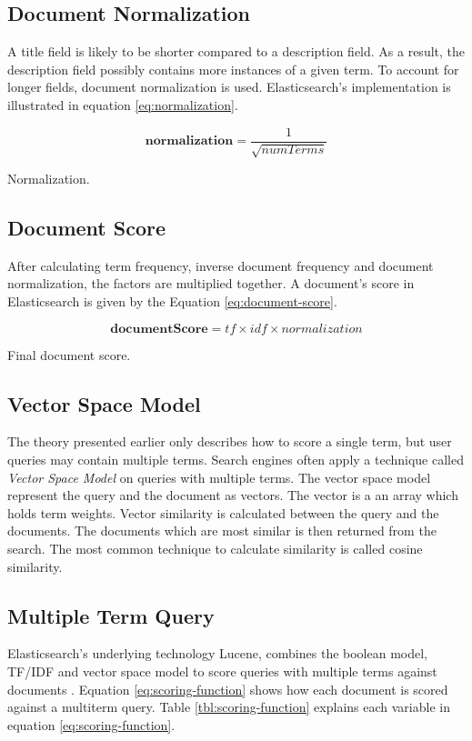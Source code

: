 \subsection{Document Normalization}
A title field is likely to be shorter compared to a description field.
As a result, the description field possibly contains more instances of a given term.
To account for longer fields, document normalization is used.
Elasticsearch's implementation is illustrated in equation \ref{eq:normalization}.

\begin{cequation}[H]
	\begin{equation}
		\mathbf{normalization} = \frac{1}{\sqrt{numTerms}}
	\end{equation}
	\caption{Normalization.}
  \label{eq:normalization}
\end{cequation}

\subsection{Document Score}
\label{sec:doc-score}
After calculating term frequency, inverse document frequency and document normalization, the factors are multiplied together.
A document's score in Elasticsearch is given by the Equation \ref{eq:document-score}.

\begin{cequation}[H]
	\begin{equation}
		\mathbf{documentScore} = tf \times idf \times normalization
	\end{equation}
	\caption{Final document score.}
  \label{eq:document-score}
\end{cequation}

\subsection{Vector Space Model}
The theory presented earlier only describes how to score a single term, but user queries may contain multiple terms.
Search engines often apply a technique called \textit{Vector Space Model} on queries with multiple terms.
The vector space model represent the query and the document as vectors.
The vector is a an array which holds term weights.
Vector similarity is calculated between the query and the documents.
The documents which are most similar is then returned from the search.
The most common technique to calculate similarity is called cosine similarity.

\subsection{Multiple Term Query}
Elasticsearch's underlying technology Lucene,
combines the boolean model, TF/IDF and vector space model to score queries with multiple terms against documents \cite{lucene-scoring-function}.
Equation \ref{eq:scoring-function} shows how each document is scored against a multiterm query.
Table \ref{tbl:scoring-function} explains each variable in equation \ref{eq:scoring-function}.

